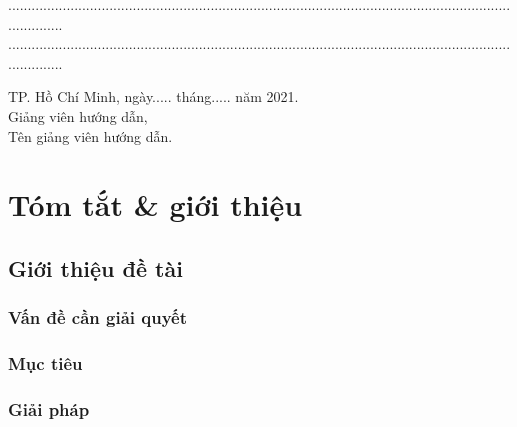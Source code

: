 \documentclass[12pt,a4paper,2sides]{report}
\newcommand{\gvhd}{Tên giảng viên hướng dẫn} %
\newcommand{\nam}{2021}
\begin{document}
	...............................................................................................................................................\\
	...............................................................................................................................................
\begin{center}
	\hspace*{5cm} TP. Hồ Chí Minh, ngày..... tháng..... năm \nam.\\
	\hspace*{5cm} Giảng viên hướng dẫn,\\
	\vspace*{2cm}
	\hspace*{5cm} \gvhd.
\newpage
\end{center}

\newpage
\clearpage
\dominitoc
\tableofcontents %
\newpage
\clearpage
\clearpage
{}
\setcounter{page}{1}
\clearpage
%


\chapter{Tóm tắt \& giới thiệu}
\newpage
\section{Giới thiệu đề tài} %
\subsection{Vấn đề cần giải quyết} %
\subsection{Mục tiêu} %
\subsection{Giải pháp} %
\end{document}
